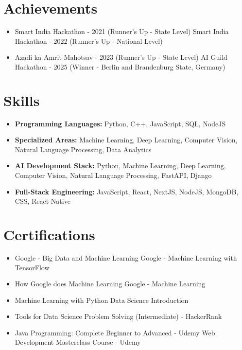 \documentclass[a4paper,10pt]{article}
\begin{document}
\section*{Achievements}
\begin{itemize}
\item Smart India Hackathon - 2021 (Runner's Up - State Level) \hfill Smart India Hackathon - 2022 (Runner's Up - National Level)
\item Azadi ka Amrit Mahotsav - 2023 (Runner's Up - State Level) \hfill AI Guild Hackathon - 2025 (Winner - Berlin and Brandenburg State, Germany)
\end{itemize}

\section*{Skills}
\begin{itemize}
  \item \textbf{Programming Languages:} Python, C++, JavaScript, SQL, NodeJS
  \item \textbf{Specialized Areas:} Machine Learning, Deep Learning, Computer Vision, Natural Language Processing, Data Analytics
  \item \textbf{AI Development Stack:} Python, Machine Learning, Deep Learning, Computer Vision, Natural Language Processing, FastAPI, Django
  \item \textbf{Full-Stack Engineering:} JavaScript, React, NextJS, NodeJS, MongoDB, CSS, React-Native
\end{itemize}

\section*{Certifications}
\begin{itemize}
\item Google - Big Data and Machine Learning \hfill Google - Machine Learning with TensorFlow
\item How Google does Machine Learning \hfill Google - Machine Learning
\item Machine Learning with Python \hfill Data Science Introduction
\item Tools for Data Science \hfill Problem Solving (Intermediate) - HackerRank
\item Java Programming: Complete Beginner to Advanced - Udemy \hfill Web Development Masterclass Course - Udemy
\end{itemize}
\end{document}
